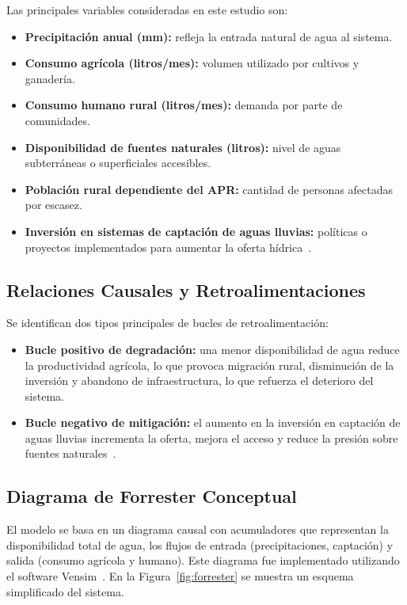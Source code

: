 \documentclass[10pt]{article}
\begin{document}
Las principales variables consideradas en este estudio son:

\begin{itemize}
    \item \textbf{Precipitación anual (mm):} refleja la entrada natural de agua al sistema.
    \item \textbf{Consumo agrícola (litros/mes):} volumen utilizado por cultivos y ganadería.
    \item \textbf{Consumo humano rural (litros/mes):} demanda por parte de comunidades.
    \item \textbf{Disponibilidad de fuentes naturales (litros):} nivel de aguas subterráneas o superficiales accesibles.
    \item \textbf{Población rural dependiente del APR:} cantidad de personas afectadas por escasez.
    \item \textbf{Inversión en sistemas de captación de aguas lluvias:} políticas o proyectos implementados para aumentar la oferta hídrica~\parencite{dgapublic2023}.
\end{itemize}
\subsection{Relaciones Causales y Retroalimentaciones}
Se identifican dos tipos principales de bucles de retroalimentación:
\begin{itemize}
    \item \textbf{Bucle positivo de degradación:} una menor disponibilidad de agua reduce la productividad agrícola, lo que provoca migración rural, disminución de la inversión y abandono de infraestructura, lo que refuerza el deterioro del sistema.
    \item \textbf{Bucle negativo de mitigación:} el aumento en la inversión en captación de aguas lluvias incrementa la oferta, mejora el acceso y reduce la presión sobre fuentes naturales~\parencite{sterman2000}.
\end{itemize}
\subsection{Diagrama de Forrester Conceptual}
El modelo se basa en un diagrama causal con acumuladores que representan la disponibilidad total de agua, los flujos de entrada (precipitaciones, captación) y salida (consumo agrícola y humano). Este diagrama fue implementado utilizando el software Vensim~\parencite{vensimdocs}. En la Figura~\ref{fig:forrester} se muestra un esquema simplificado del sistema.
\end{document}
